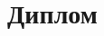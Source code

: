 \documentclass[14pt,a4paper,russian]{extreport}
\begin{document}
\title{Диплом}

\maketitle

\tableofcontents %





	\PrintTextInfo
	



\end{document}
